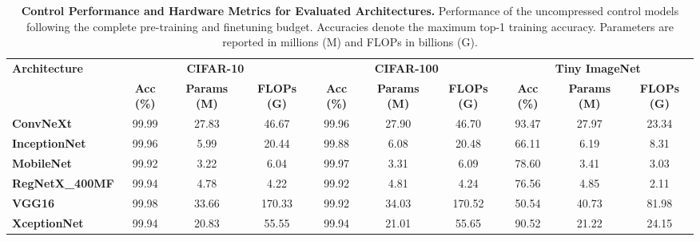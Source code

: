 \begin{table}[htbp]
    \centering
    \caption{\textbf{Control Performance and Hardware Metrics for Evaluated Architectures.} Performance of the uncompressed control models following the complete pre-training and finetuning budget. Accuracies denote the maximum top-1 training accuracy. Parameters are reported in millions (M) and FLOPs in billions (G).}
    \label{tab:control_metrics}
    \begin{tabular}{l | ccc | ccc | ccc}\toprule
        \textbf{Architecture} & \multicolumn{3}{c|}{\textbf{CIFAR-10}} & \multicolumn{3}{c|}{\textbf{CIFAR-100}} & \multicolumn{3}{c}{\textbf{Tiny ImageNet}} \\
        \cmidrule{2-10}
        & \textbf{Acc (\%)} & \textbf{Params (M)} & \textbf{FLOPs (G)} & \textbf{Acc (\%)} & \textbf{Params (M)} & \textbf{FLOPs (G)} & \textbf{Acc (\%)} & \textbf{Params (M)} & \textbf{FLOPs (G)} \\
        \midrule
        \textbf{ConvNeXt} & 99.99 & 27.83 & 46.67 & 99.96 & 27.90 & 46.70 & 93.47 & 27.97 & 23.34 \\
        \textbf{InceptionNet} & 99.96 & 5.99 & 20.44 & 99.88 & 6.08 & 20.48 & 66.11 & 6.19 & 8.31 \\
        \textbf{MobileNet} & 99.92 & 3.22 & 6.04 & 99.97 & 3.31 & 6.09 & 78.60 & 3.41 & 3.03 \\
        \textbf{RegNetX\_400MF} & 99.94 & 4.78 & 4.22 & 99.92 & 4.81 & 4.24 & 76.56 & 4.85 & 2.11 \\
        \textbf{VGG16} & 99.98 & 33.66 & 170.33 & 99.92 & 34.03 & 170.52 & 50.54 & 40.73 & 81.98 \\
        \textbf{XceptionNet} & 99.94 & 20.83 & 55.55 & 99.94 & 21.01 & 55.65 & 90.52 & 21.22 & 24.15 \\
        \bottomrule
    \end{tabular}
\end{table}
